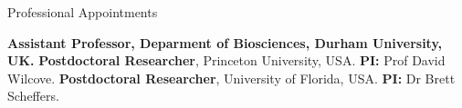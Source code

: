 \begin{rubric}{Professional Appointments}

%
	\textbf{Assistant Professor, Deparment of Biosciences, Durham University, UK.}
%
\entry*[2019 -- 2021]%
	\textbf{Postdoctoral Researcher}, Princeton University, USA. \textbf{PI:} Prof David Wilcove.
\entry*[2019]%
	\textbf{Postdoctoral Researcher}, University of Florida, USA. \textbf{PI:} Dr Brett Scheffers.
%
\end{rubric}